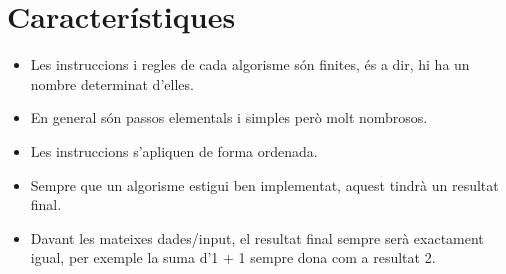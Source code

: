 \section{Característiques}

\begin{itemize}
\item Les instruccions i regles de cada algorisme són finites, és a dir, hi ha un nombre determinat d'elles.
    \item En general són passos elementals i simples però molt nombrosos.
    \item Les instruccions s'apliquen de forma ordenada.
    \item Sempre que un algorisme estigui ben implementat, aquest tindrà un resultat final.
    \item Davant les mateixes dades/input, el resultat final sempre serà exactament igual, per exemple la suma d'1 + 1 sempre dona com a resultat 2.
\end{itemize}